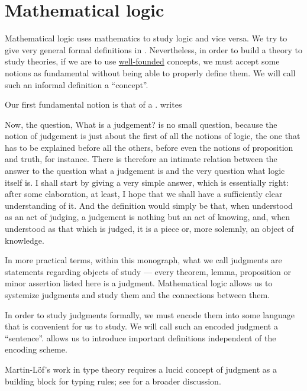 \chapter{Mathematical logic}\label{ch:mathematical_logic}

Mathematical logic uses mathematics to study logic and vice versa. We try to give very general formal definitions in . Nevertheless, in order to build a theory to study theories, if we are to use \hyperref[def:well_founded_relation]{well-founded} concepts, we must accept some notions as fundamental without being able to properly define them. We will call such an informal definition a \enquote{concept}.

\begin{concept}\label{con:judgment}
  Our first fundamental notion is that of a .  writes
  \begin{displayquote}
    Now, the question, What is a judgement? is no small question, because the notion of judgement is just about the first of all the notions of logic, the one that has to be explained before all the others, before even the notions of proposition and truth, for instance. There is therefore an intimate relation between the answer to the question what a judgement is and the very question what logic itself is. I shall start by giving a very simple answer, which is essentially right: after some elaboration, at least, I hope that we shall have a sufficiently clear understanding of it. And the definition would simply be that, when understood as an act of judging, a judgement is nothing but an act of knowing, and, when understood as that which is judged, it is a piece or, more solemnly, an object of knowledge.
  \end{displayquote}
\end{concept}
\begin{comments}
  \item In more practical terms, within this monograph, what we call judgments are statements regarding objects of study --- every theorem, lemma, proposition or minor assertion listed here is a judgment. Mathematical logic allows us to systemize judgments and study them and the connections between them.

  \item In order to study judgments formally, we must encode them into some language that is convenient for us to study. We will call such an encoded judgment a \enquote{sentence}.  allows us to introduce important definitions independent of the encoding scheme.

  \item Martin-L\"of's work in type theory requires a lucid concept of judgment as a building block for typing rules; see  for a broader discussion.
\end{comments}


